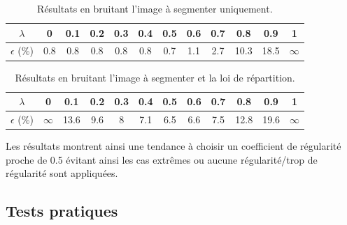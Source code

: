 \documentclass{article}
\begin{document}
\begin{table}[h!]
\begin{center}
  \begin{tabular}{|c|c|c|c|c|c|c|c|c|c|c|c|}
		\hline
		$\lambda$ & 0 & 0.1& 0.2 & 0.3 & 0.4 & 0.5 & 0.6 & 0.7 & 0.8 & 0.9 & 1\\
		\hline
        $\epsilon$ (\%) & 0.8 & 0.8 & 0.8 & 0.8 & 0.8 & 0.7 & 1.1 & 2.7 & 10.3 & 18.5 & $\infty$\\
		\hline
\end{tabular}
\end{center}
\caption{Résultats en bruitant l'image à segmenter uniquement.}
\end{table}

\begin{table}[h!]
\begin{center}
  \begin{tabular}{|c|c|c|c|c|c|c|c|c|c|c|c|}
		\hline
		$\lambda$ & 0 & 0.1& 0.2 & 0.3 & 0.4 & 0.5 & 0.6 & 0.7 & 0.8 & 0.9 & 1\\
		\hline
		$\epsilon$ (\%) & $\infty$ & 13.6 & 9.6 & 8 & 7.1 & 6.5 & 6.6 & 7.5 & 12.8 & 19.6 & $\infty$\\
		\hline
\end{tabular}
\end{center}
\caption{Résultats en bruitant l'image à segmenter et la loi de répartition.}
\end{table}

Les résultats montrent ainsi une tendance à choisir un coefficient de régularité proche de 0.5 évitant ainsi les cas extrêmes ou aucune régularité/trop de régularité sont appliquées.

\subsection{Tests pratiques}

\end{document}
